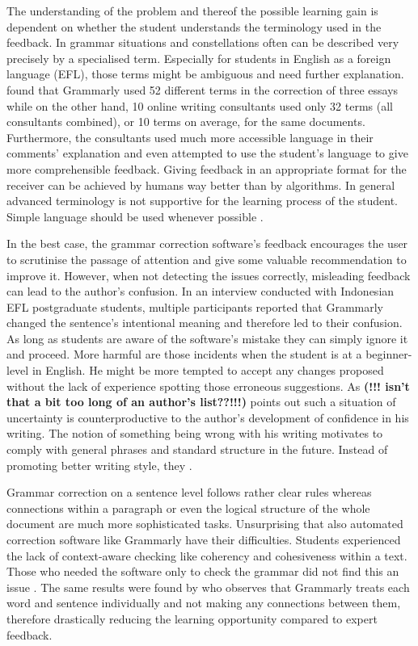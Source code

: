 \documentclass[runningheads]{llncs}
\let\OldTextregistered\textregistered
\renewcommand{\textregistered}{\OldTextregistered\xspace}%
\begin{document}
The understanding of the problem and thereof the possible learning gain is dependent on whether the student understands the terminology used in the feedback. In grammar situations and constellations often can be described very precisely by a specialised term. Especially for students in English as a foreign language (EFL), those terms might be ambiguous and need further explanation. \textcite{dembsey_closing_2017} found that Grammarly\textregistered used 52 different terms in the correction of three essays while on the other hand, 10 online writing consultants used only 32 terms (all consultants combined), or 10 terms on average, for the same documents. Furthermore, the consultants used much more accessible language in their comments' explanation and even attempted to use the student's language to give more comprehensible feedback. Giving feedback in an appropriate format for the receiver can be achieved by humans way better than by algorithms. In general advanced terminology is not supportive for the learning process of the student. Simple language should be used whenever possible \citep{dembsey_closing_2017}.

In the best case, the grammar correction software's feedback encourages the user to scrutinise the passage of attention and give some valuable recommendation to improve it. However, when not detecting the issues correctly, misleading feedback can lead to the author's confusion. In an interview conducted with Indonesian EFL postgraduate students, \citep{nova_utilizing_2018} multiple participants reported that Grammarly\textregistered changed the sentence's intentional meaning and therefore led to their confusion. As long as students are aware of the software's mistake they can simply ignore it and proceed. More harmful are those incidents when the student is at a beginner-level in English. He might be more tempted to accept any changes proposed without the lack of experience spotting those erroneous suggestions. As \textcite{vojak_new_2011} \textbf{(!!! isn't that a bit too long of an author's list??!!!)} points out such a situation of uncertainty is counterproductive to the author's development of confidence in his writing. The notion of something being wrong with his writing motivates to comply with general phrases and standard structure in the future. Instead of promoting better writing style, they . 

Grammar correction on a sentence level follows rather clear rules whereas connections within a paragraph or even the logical structure of the whole document are much more sophisticated tasks. Unsurprising that also automated correction software like Grammarly\textregistered have their difficulties. Students experienced the lack of context-aware checking like coherency and cohesiveness within a text. Those who needed the software only to check the grammar did not find this an issue \citep{nova_utilizing_2018}. The same results were found by \textcite{dembsey_closing_2017} who observes that Grammarly\textregistered treats each word and sentence individually and not making any connections between them, therefore drastically reducing the learning opportunity compared to expert feedback.
\end{document}
